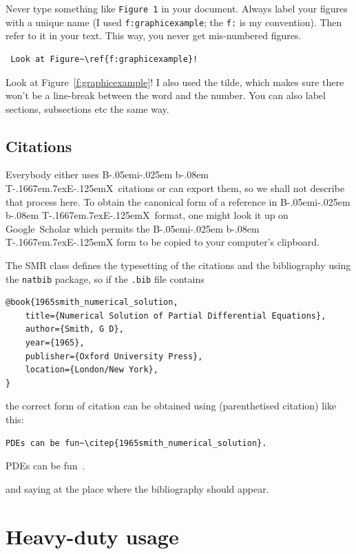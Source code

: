 \documentclass{SMR}
\begin{document}
Never type something like \texttt{Figure 1} in your document.
Always label your figures with a unique name (I used \texttt{f:graphicexample};
the \texttt{f:} is my convention). Then refer to it in your text.
This way, you never get mis-numbered figures.

\begin{verbatim}
 Look at Figure~\ref{f:graphicexample}!
\end{verbatim}

Look at Figure~\ref{f:graphicexample}!
I also used the tilde, which makes sure there won't be a line-break between
the word and the number. You can also label sections, subsections etc
the same way.

\subsection{Citations}

\def\BibTeX{{\rm B\kern-.05em{\sc i\kern-.025em b}\kern-.08em
    T\kern-.1667em\lower.7ex\hbox{E}\kern-.125emX}}
Everybody either uses \BibTeX\ citations or can export them, so we shall not
describe that process here. To obtain the canonical form of a reference in
\BibTeX\ format, one might look it up on Google~Scholar which permits the \BibTeX
form to be copied to your computer's clipboard.

The SMR class defines the typesetting of the citations and the bibliography
using the \texttt{natbib} package, so if the \texttt{.bib} file contains

\begin{verbatim}
@book{1965smith_numerical_solution,
	title={Numerical Solution of Partial Differential Equations},
	author={Smith, G D},
	year={1965},
	publisher={Oxford University Press},
	location={London/New York},
}
\end{verbatim}

the correct form of citation can be obtained using 
(parenthetised citation) like this:

\begin{verbatim}
PDEs can be fun~\citep{1965smith_numerical_solution}.
\end{verbatim}

PDEs can be fun~\citep{1965smith_numerical_solution}.

and saying  at the place where
the bibliography should appear.



\section{Heavy-duty usage}
\end{document}
